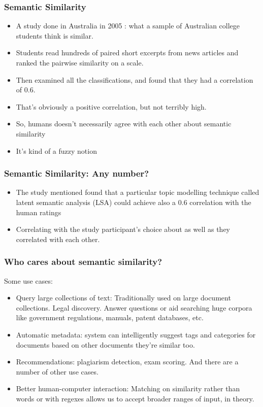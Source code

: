 \begin{frame}[fragile]\frametitle{Semantic Similarity}
  \begin{itemize}
  	\item A study done in Australia in 2005 : what a sample of Australian college students think is similar. 
	\item Students read hundreds of paired short excerpts from news articles and ranked the pairwise similarity on a scale. 	
	\item Then examined all the classifications, and found that they had a correlation of 0.6. 
	\item That's obviously a positive correlation, but not terribly high. 
	\item So, humans doesn't necessarily agree with each other about semantic similarity
	\item It's kind of a fuzzy notion
  \end{itemize}
\end{frame}

\begin{frame}[fragile]\frametitle{Semantic Similarity: Any number?}
  \begin{itemize}
  	\item The study mentioned found that a particular topic modelling technique called latent semantic analysis (LSA) could achieve also a 0.6 correlation with the human ratings
	\item Correlating with the study participant's choice about as well as they correlated with each other.
  \end{itemize}
\end{frame}

\begin{frame}[fragile]\frametitle{Who cares about semantic similarity? }
Some use cases:

  \begin{itemize}
  	\item Query large collections of text: Traditionally used on large document collections. Legal discovery. Answer questions or aid searching huge corpora like government regulations, manuals, patent databases, etc.

  	\item  Automatic metadata: system can intelligently suggest tags and categories for documents based on other documents they're similar too. 
  	\item  Recommendations: plagiarism detection, exam scoring. And there are a number of other use cases. 
  	\item  Better human-computer interaction: Matching on similarity rather than words or with regexes allows us to accept broader ranges of input, in theory. 

  \end{itemize}
\end{frame}

